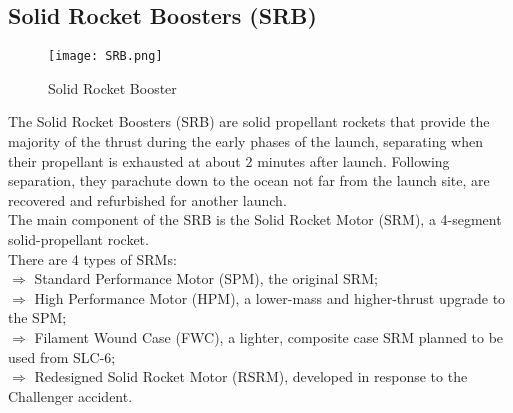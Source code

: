 \documentclass[Space_Shuttle_Vessel_Manual.tex]{subfiles}
\begin{document}
\subsection{Solid Rocket Boosters (SRB)}
\begin{figure}[b!]
  \texttt{[image: SRB.png]}
  \caption{Solid Rocket Booster}
  \label{fig:SRB}
\end{figure}
\begin{multicols*}{2}
The Solid Rocket Boosters (SRB) are solid propellant rockets that provide the majority of the thrust during the early phases of the launch, separating when their propellant is exhausted at about 2 minutes after launch. Following separation, they parachute down to the ocean not far from the launch site, are recovered and refurbished for another launch.\\
The main component of the SRB is the Solid Rocket Motor (SRM), a 4-segment solid-propellant rocket.\\
There are 4 types of SRMs$\colon$\\
$\Rightarrow$ Standard Performance Motor (SPM), the original SRM;\\
$\Rightarrow$ High Performance Motor (HPM), a lower-mass and higher-thrust upgrade to the SPM;\\
$\Rightarrow$ Filament Wound Case (FWC), a lighter, composite case SRM planned to be used from SLC-6;\\
$\Rightarrow$ Redesigned Solid Rocket Motor (RSRM), developed in response to the Challenger accident.\\
\end{multicols*}
\end{document}
